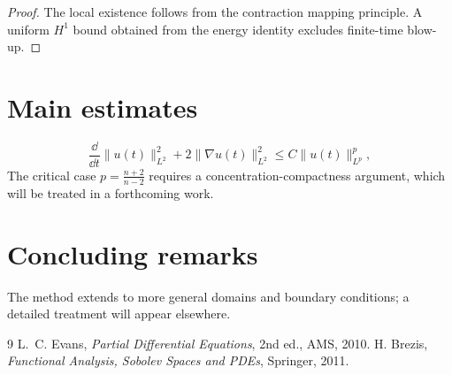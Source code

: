 \begin{proof}
The local existence follows from the contraction mapping principle. A uniform $H^1$ bound obtained from the energy identity excludes finite-time blow-up.
\end{proof}

\section{Main estimates}
\begin{equation}
\frac{\dd}{\dd t}\|u(t)\|_{L^2}^2+2\|\nabla u(t)\|_{L^2}^2 \le C\|u(t)\|_{L^p}^{p},
\end{equation}
The critical case $p=\frac{n+2}{n-2}$ requires a concentration-compactness argument, which will be treated in a forthcoming work.

\section{Concluding remarks}
The method extends to more general domains and boundary conditions; a detailed
treatment will appear elsewhere.

\begin{thebibliography}{9}
 L.~C. Evans, \emph{Partial Differential Equations}, 2nd ed., AMS, 2010.
 H. Brezis, \emph{Functional Analysis, Sobolev Spaces and PDEs}, Springer, 2011.
\end{thebibliography}

